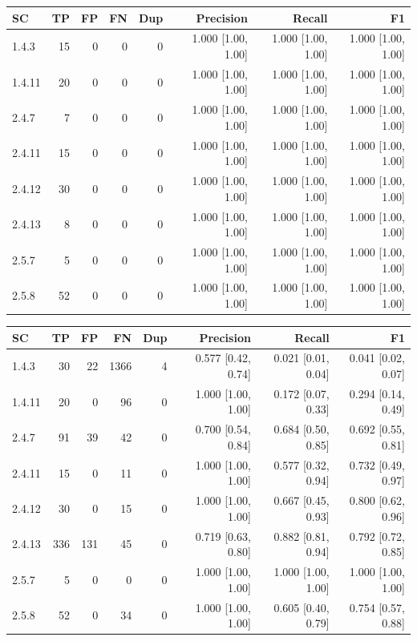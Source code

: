 \begin{tabular}{lrrrrrrr}
\hline
SC & TP & FP & FN & Dup & Precision & Recall & F1 \\
\hline
1.4.3 & 15 & 0 & 0 & 0 & 1.000 [1.00, 1.00] & 1.000 [1.00, 1.00] & 1.000 [1.00, 1.00] \\
1.4.11 & 20 & 0 & 0 & 0 & 1.000 [1.00, 1.00] & 1.000 [1.00, 1.00] & 1.000 [1.00, 1.00] \\
2.4.7 & 7 & 0 & 0 & 0 & 1.000 [1.00, 1.00] & 1.000 [1.00, 1.00] & 1.000 [1.00, 1.00] \\
2.4.11 & 15 & 0 & 0 & 0 & 1.000 [1.00, 1.00] & 1.000 [1.00, 1.00] & 1.000 [1.00, 1.00] \\
2.4.12 & 30 & 0 & 0 & 0 & 1.000 [1.00, 1.00] & 1.000 [1.00, 1.00] & 1.000 [1.00, 1.00] \\
2.4.13 & 8 & 0 & 0 & 0 & 1.000 [1.00, 1.00] & 1.000 [1.00, 1.00] & 1.000 [1.00, 1.00] \\
2.5.7 & 5 & 0 & 0 & 0 & 1.000 [1.00, 1.00] & 1.000 [1.00, 1.00] & 1.000 [1.00, 1.00] \\
2.5.8 & 52 & 0 & 0 & 0 & 1.000 [1.00, 1.00] & 1.000 [1.00, 1.00] & 1.000 [1.00, 1.00] \\
\hline
\end{tabular}

\begin{tabular}{lrrrrrrr}
\hline
SC & TP & FP & FN & Dup & Precision & Recall & F1 \\
\hline
1.4.3 & 30 & 22 & 1366 & 4 & 0.577 [0.42, 0.74] & 0.021 [0.01, 0.04] & 0.041 [0.02, 0.07] \\
1.4.11 & 20 & 0 & 96 & 0 & 1.000 [1.00, 1.00] & 0.172 [0.07, 0.33] & 0.294 [0.14, 0.49] \\
2.4.7 & 91 & 39 & 42 & 0 & 0.700 [0.54, 0.84] & 0.684 [0.50, 0.85] & 0.692 [0.55, 0.81] \\
2.4.11 & 15 & 0 & 11 & 0 & 1.000 [1.00, 1.00] & 0.577 [0.32, 0.94] & 0.732 [0.49, 0.97] \\
2.4.12 & 30 & 0 & 15 & 0 & 1.000 [1.00, 1.00] & 0.667 [0.45, 0.93] & 0.800 [0.62, 0.96] \\
2.4.13 & 336 & 131 & 45 & 0 & 0.719 [0.63, 0.80] & 0.882 [0.81, 0.94] & 0.792 [0.72, 0.85] \\
2.5.7 & 5 & 0 & 0 & 0 & 1.000 [1.00, 1.00] & 1.000 [1.00, 1.00] & 1.000 [1.00, 1.00] \\
2.5.8 & 52 & 0 & 34 & 0 & 1.000 [1.00, 1.00] & 0.605 [0.40, 0.79] & 0.754 [0.57, 0.88] \\
\hline
\end{tabular}

